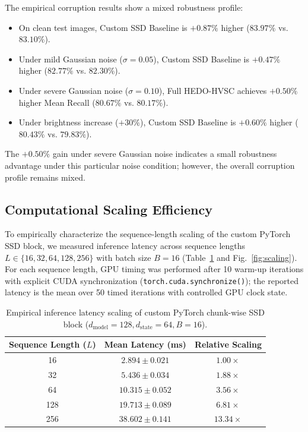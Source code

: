 \documentclass[pdflatex,sn-mathphys-num]{sn-jnl}%
\begin{document}
The empirical corruption results show a mixed robustness profile:
\begin{itemize}
    \item On clean test images, Custom SSD Baseline is $+0.87\%$ higher ($83.97\%$ vs. $83.10\%$).
    \item Under mild Gaussian noise ($\sigma=0.05$), Custom SSD Baseline is $+0.47\%$ higher ($82.77\%$ vs. $82.30\%$).
    \item Under severe Gaussian noise ($\sigma=0.10$), Full HEDO-HVSC achieves $\mathbf{+0.50\%}$ higher Mean Recall ($80.67\%$ vs. $80.17\%$).
    \item Under brightness increase ($+30\%$), Custom SSD Baseline is $+0.60\%$ higher ($80.43\%$ vs. $79.83\%$).
\end{itemize}
The $+0.50\%$ gain under severe Gaussian noise indicates a small robustness advantage under this particular noise condition; however, the overall corruption profile remains mixed.

\subsection{Computational Scaling Efficiency}
To empirically characterize the sequence-length scaling of the custom PyTorch SSD block, we measured inference latency across sequence lengths $L \in \{16, 32, 64, 128, 256\}$ with batch size $B=16$ (Table~\ref{tab:scaling} and Fig.~\ref{fig:scaling}). For each sequence length, GPU timing was performed after 10 warm-up iterations with explicit CUDA synchronization (\texttt{torch.cuda.synchronize()}); the reported latency is the mean over 50 timed iterations with controlled GPU clock state.

\begin{table}[!htbp]
\centering
\caption{Empirical inference latency scaling of custom PyTorch chunk-wise SSD block ($d_{\text{model}}=128, d_{\text{state}}=64, B=16$).}
\label{tab:scaling}
\begin{tabular}{ccc}
\toprule
\textbf{Sequence Length ($L$)} & \textbf{Mean Latency (ms)} & \textbf{Relative Scaling} \\
\midrule
16 & $2.894 \pm 0.021$ & $1.00\times$ \\
32 & $5.436 \pm 0.034$ & $1.88\times$ \\
64 & $10.315 \pm 0.052$ & $3.56\times$ \\
128 & $19.713 \pm 0.089$ & $6.81\times$ \\
256 & $38.602 \pm 0.141$ & $13.34\times$ \\
\bottomrule
\end{tabular}
\end{table}
\end{document}
